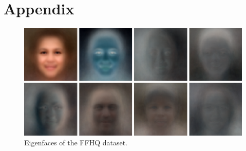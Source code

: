 \newpage
\appendix
{}

\section{Appendix}

\begin{figure}[h!]
  \includegraphics[width=\textwidth]{fig/PCA/pca}
  \caption{Eigenfaces of the FFHQ dataset.}
  \label{eigenface}
\end{figure}

